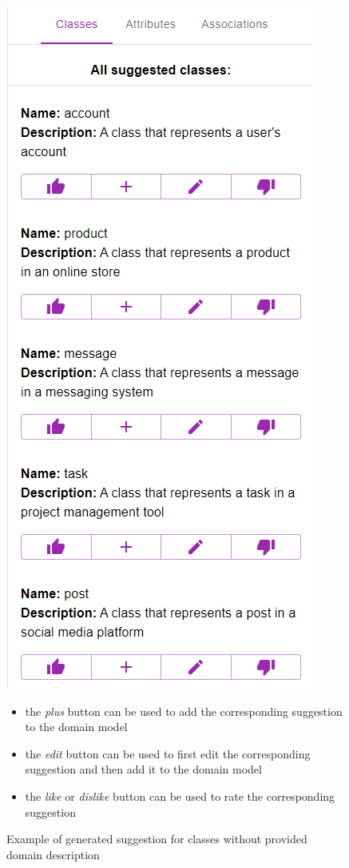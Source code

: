 \begin{figure}[!h]
    \includegraphics[scale=0.45]{../docs/images/frontend/suggested-classes.png} \\
    \begin{itemize}
    \item the \textit{plus} button can be used to add the corresponding suggestion to the domain model
    \item the \textit{edit} button can be used to first edit the corresponding suggestion and then add it to the domain model
    \item the \textit{like} or \textit{dislike} button can be used to rate the corresponding suggestion
    \end{itemize}
    \caption{\centering Example of generated suggestion for classes without provided domain description}
    \label{fig:suggested_classes}
\end{figure}

